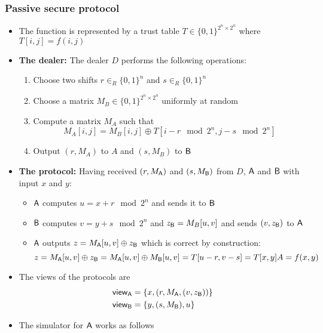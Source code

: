 \subsubsection{Passive secure protocol}
\begin{itemize}
    \item The function is represented by a trust table $T \in \{0,1\}^{2^n \times 2^n}$ where $T[i,j] = f(i,j)$ 
    \item \textbf{The dealer:} The dealer $D$ performs the following operations:
    \begin{enumerate}
        \item Choose two shifts $r \in_R \{0,1\}^n$ and $s \in_R \{0,1\}^n$
        \item Choose a matrix $M_B \in \{0,1\}^{2^n \times 2^n}$ uniformly at random
        \item Compute a matrix $M_A$ such that
        \begin{equation*}
            M_A [i,j] = M_B [i,j] \oplus T[i-r \mod 2^n, j-s \mod 2^n]
        \end{equation*}
    \item Output $(r, M_A)$ to $A$ and $(s, M_B)$ to $\mathsf{B}$
    \end{enumerate}
    \item \textbf{The protocol:} Having received $(r, M_{\mathsf{A}})$ and $(s, M_{\mathsf{B}})$ from $D$, $\mathsf{A}$ and $\mathsf{B}$ with input $x$ and $y$:
    \begin{itemize}
        \item $\mathsf{A}$ computes $u = x+r \mod 2^n$ and sends it to $\mathsf{B}$
        \item $\mathsf{B}$ computes $v = y+s \mod 2^n$ and $z_{\mathsf{B}} = M_B[u,v]$ and sends $(v, z_{\mathsf{B}})$ to $\mathsf{A}$
        \item $\mathsf{A}$ outputs $z = M_{\mathsf{A}}[u,v] \oplus z_{\mathsf{B}}$ which is correct by construction:
        \begin{equation*}
            z = M_{\mathsf{A}}[u,v] \oplus z_{\mathsf{B}} = M_{\mathsf{A}}[u,v] \oplus M_{\mathsf{B}}[u,v] = T[u-r, v-s] = T[x,y]A = f(x,y)
        \end{equation*}
    \end{itemize}
    \item The views of the protocols are
    \begin{align*}
        \mathsf{view}_{\mathsf{A}} &= \{x, (r, M_{\mathsf{A}}, (v, z_{\mathsf{B}}))\} \\
        \mathsf{view}_{\mathsf{B}} &= \{y, (s, M_{\mathsf{B}}), u\}
    \end{align*}
    \item The simulator for $\mathsf{A}$ works as follows
    \begin{enumerate}

\end{enumerate}
\end{itemize}
